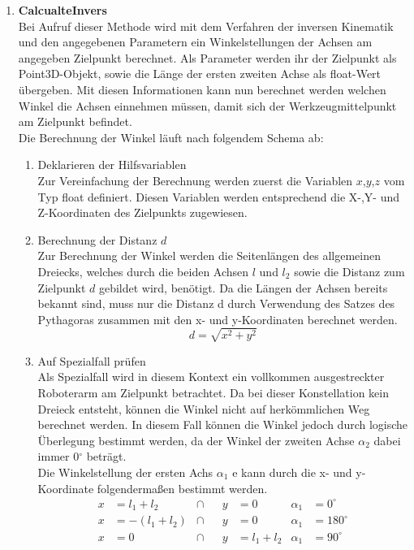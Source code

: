 \begin{itemize}
\begin{enumerate}
\item \textbf{CalcualteInvers}\\
Bei Aufruf dieser Methode wird mit dem Verfahren der inversen Kinematik und den angegebenen Parametern ein Winkelstellungen der Achsen am angegeben Zielpunkt berechnet. Als Parameter werden ihr der Zielpunkt als Point3D-Objekt, sowie die Länge der ersten zweiten Achse als float-Wert übergeben. Mit diesen Informationen kann nun berechnet werden welchen Winkel die Achsen einnehmen müssen, damit  sich der Werkzeugmittelpunkt am Zielpunkt befindet.\\
Die Berechnung der Winkel läuft nach folgendem Schema ab:
\begin{enumerate}
\item Deklarieren der Hilfsvariablen\\
Zur Vereinfachung der Berechnung werden zuerst die Variablen $x$,$y$,$z$ vom Typ float definiert. Diesen Variablen werden entsprechend die X-,Y- und Z-Koordinaten des Zielpunkts zugewiesen.
\item Berechnung der Distanz $d$\\
Zur Berechnung der Winkel werden die Seitenlängen des allgemeinen Dreiecks, welches durch die beiden Achsen $l$ und $l_2$ sowie die Distanz zum Zielpunkt $d$ gebildet wird, benötigt. Da die Längen der Achsen bereits bekannt sind, muss nur die Distanz d durch Verwendung des Satzes des Pythagoras zusammen mit den x- und y-Koordinaten berechnet werden.\\
\begin{equation*}
d = \sqrt{x^2 + y^2}
\end{equation*}
\item Auf Spezialfall prüfen\\
Als Spezialfall wird in diesem Kontext ein vollkommen ausgestreckter Roboterarm am Zielpunkt betrachtet. Da bei dieser Konstellation kein Dreieck entsteht, können die Winkel nicht auf herkömmlichen Weg berechnet werden. In diesem Fall können die Winkel jedoch durch logische Überlegung bestimmt werden, da der Winkel der zweiten Achse $\alpha_2$ dabei immer 0$^\circ$ beträgt.\\
Die Winkelstellung der ersten Achs $\alpha_1$ e kann durch die x- und y-Koordinate folgendermaßen bestimmt werden.
\begin{align*}
x & = l_1+l_2 &\cap && y & = 0 & \alpha_1 & = 0^\circ \\
x & = -(l_1+l_2) &\cap && y & = 0 & \alpha_1 & = 180^\circ \\ 
x & = 0 &\cap && y & = l_1+l_2 & \alpha_1 & = 90^\circ \\

\end{align*}
\end{enumerate}
\end{enumerate}
\end{itemize}
